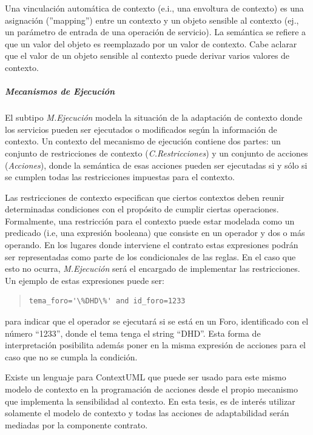 Una vinculación automática de contexto (e.i., una envoltura de contexto) es
una asignación (''mapping'') entre un contexto y un objeto sensible al
contexto (ej., un parámetro de entrada de una operación de servicio). La
semántica se refiere a que un valor del objeto es reemplazado por un valor de contexto.
Cabe aclarar que el valor de un objeto sensible al contexto puede derivar varios
valores de contexto. 
 

\subparagraph{Mecanismos de Ejecución}

El subtipo \textit{M.Ejecución} modela la situación de la adaptación de
contexto
donde los servicios pueden ser ejecutados o modificados según la información
de contexto. Un contexto del mecanismo de ejecución contiene dos partes: un
conjunto de restricciones de contexto (\textit{C.Restricciones}) y un
conjunto de acciones (\textit{Acciones}), donde la semántica de esas acciones
pueden ser ejecutadas si
y sólo si se cumplen todas las restricciones impuestas para el contexto. 

Las restricciones de contexto especifican que ciertos contextos deben reunir
determinadas condiciones con el propósito de cumplir ciertas operaciones.
Formalmente, una restricción para el contexto puede estar modelada como un
predicado\cite{ContextUML} (i.e, una expresión booleana) que consiste en un
operador y dos o más operando. En los lugares donde interviene el contrato
estas expresiones podrán ser representadas como parte de los condicionales
de las reglas. En el caso que esto no ocurra, \textit{M.Ejecución} será el
encargado de implementar las restricciones. Un ejemplo de estas expresiones
puede ser: 

\begin{verse}

\begin{verbatim}
tema_foro='\%DHD\%' and id_foro=1233
\end{verbatim}               

\end{verse} 


para indicar que el operador se ejecutará si se está en un Foro, identificado con el número “1233”, donde el tema tenga el string “DHD”. Esta forma de interpretación posibilita además poner en la misma expresión de acciones para el caso que no se cumpla la condición.

Existe un lenguaje para ContextUML\cite{ContextUML} que puede ser usado para
este mismo modelo de contexto en la programación de acciones desde
el propio mecanismo que implementa la sensibilidad al contexto. En esta tesis,
es de interés utilizar solamente el modelo de contexto y todas las acciones de
adaptabilidad serán mediadas por la componente contrato. 




